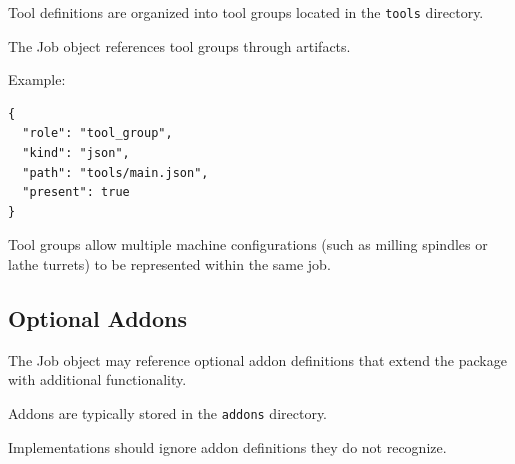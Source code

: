 Tool definitions are organized into tool groups located in the \texttt{tools} directory.

The Job object references tool groups through artifacts.

Example:

\begin{verbatim}
{
  "role": "tool_group",
  "kind": "json",
  "path": "tools/main.json",
  "present": true
}
\end{verbatim}

Tool groups allow multiple machine configurations (such as milling spindles or lathe turrets) to be represented within the same job.

\subsection{Optional Addons}

The Job object may reference optional addon definitions that extend the package with additional functionality.

Addons are typically stored in the \texttt{addons} directory.

Implementations should ignore addon definitions they do not recognize.